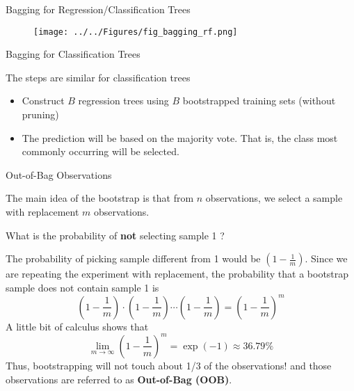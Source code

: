 \documentclass{beamer}
\begin{document}
\begin{frame}{Bagging for Regression/Classification Trees}
		 \begin{figure}[h]
		\centering
		\texttt{[image: ../../Figures/fig\_bagging\_rf.png]}
	\end{figure}
	
\end{frame}

\begin{frame}{Bagging for Classification Trees}
	
	The steps are similar for classification trees
	\begin{itemize}
		\item Construct $B$ regression trees using $B$ bootstrapped training sets (without pruning)
		\item The prediction will be based on the majority vote. That is, the class most commonly occurring will be selected.
	\end{itemize}

\end{frame}

\begin{frame}{Out-of-Bag Observations}
	
	The main idea of the bootstrap is that from $n$ observations, we select a sample with replacement $m$ observations.
	
	What is the probability of {\bf not} selecting sample 1 ?
	
	The probability of picking sample different from 1 would be 
	$(1 - \frac{1}{m})$. Since we are repeating the experiment with replacement, the probability that a bootstrap sample does not contain sample 1 is 
	\begin{equation*}
		\left(1 - \frac{1}{m}\right) \cdot \left(1 - \frac{1}{m}\right) \cdots \left(1 - \frac{1}{m}\right) = \left(1 - \frac{1}{m}\right)^m
	\end{equation*}
	 A little bit of calculus shows that 
	 \begin{equation*}
	 \lim_{m\to\infty}\left(1-\frac{1}{m}\right)^m= \exp(-1) \approx 36.79\%
	 \end{equation*}
Thus, bootstrapping will not touch about 1/3 of the observations!
and those observations are referred to as {\bf Out-of-Bag (OOB)}.  
\end{frame}
\end{document}
